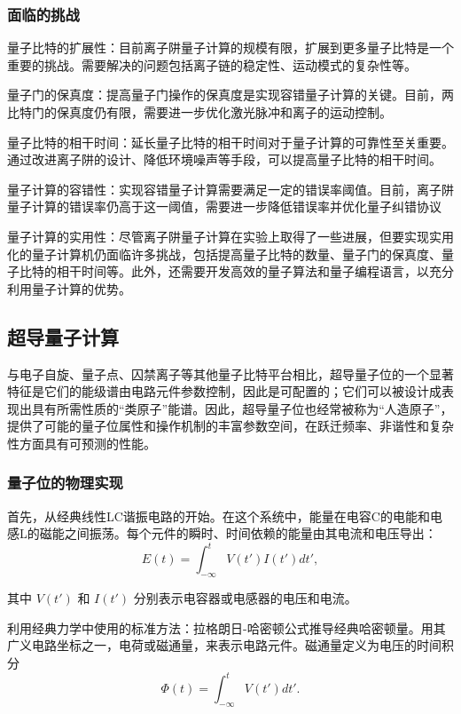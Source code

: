 \subsubsection{面临的挑战}
\begin{paralist}
    \item 量子比特的扩展性：目前离子阱量子计算的规模有限，扩展到更多量子比特是一个重要的挑战。需要解决的问题包括离子链的稳定性、运动模式的复杂性等。
    \item 量子门的保真度：提高量子门操作的保真度是实现容错量子计算的关键。目前，两比特门的保真度仍有限，需要进一步优化激光脉冲和离子的运动控制。
    \item 量子比特的相干时间：延长量子比特的相干时间对于量子计算的可靠性至关重要。通过改进离子阱的设计、降低环境噪声等手段，可以提高量子比特的相干时间。
    \item 量子计算的容错性：实现容错量子计算需要满足一定的错误率阈值。目前，离子阱量子计算的错误率仍高于这一阈值，需要进一步降低错误率并优化量子纠错协议
    \item 量子计算的实用性：尽管离子阱量子计算在实验上取得了一些进展，但要实现实用化的量子计算机仍面临许多挑战，包括提高量子比特的数量、量子门的保真度、量子比特的相干时间等。此外，还需要开发高效的量子算法和量子编程语言，以充分利用量子计算的优势。
\end{paralist}

\subsection{超导量子计算}
与电子自旋、量子点、囚禁离子等其他量子比特平台相比，超导量子位的一个显著特征是它们的能级谱由电路元件参数控制，因此是可配置的；它们可以被设计成表现出具有所需性质的“类原子”能谱。因此，超导量子位也经常被称为“人造原子”，提供了可能的量子位属性和操作机制的丰富参数空间，在跃迁频率、非谐性和复杂性方面具有可预测的性能。
\subsubsection{量子位的物理实现}
首先，从经典线性LC谐振电路的开始。在这个系统中，能量在电容C的电能和电感L的磁能之间振荡。每个元件的瞬时、时间依赖的能量由其电流和电压导出：
\[
E(t) = \int_{-\infty}^{t} V(t')I(t')dt',
\]

其中 \(V(t')\) 和 \(I(t')\) 分别表示电容器或电感器的电压和电流。

利用经典力学中使用的标准方法：拉格朗日-哈密顿公式推导经典哈密顿量。用其广义电路坐标之一，电荷或磁通量，来表示电路元件。磁通量定义为电压的时间积分
\[
\Phi(t) = \int_{-\infty}^{t} V(t')dt'.
\]

